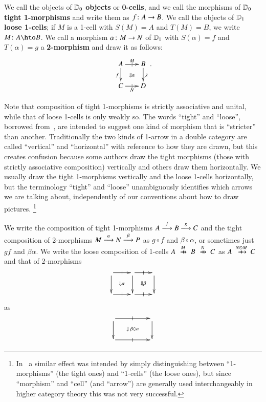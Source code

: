 We call the objects of $\lD_0$ \textbf{objects} or \textbf{0-cells},
and we call the morphisms of $\lD_0$ \textbf{tight 1-morphisms}
and write them as $f\maps A\to B$.  We call the objects of $\lD_1$
\textbf{loose 1-cells}; if $M$ is a 1-cell with $S(M)=A$ and
$T(M)=B$, we write $M\maps A\hto B$.  We call a morphism $\alpha\maps
M\to N$ of $\lD_1$ with $S(\alpha)=f$ and $T(\alpha)=g$ a
\textbf{2-morphism} and draw it as follows:
\begin{equation}\label{eq:square}
  \xymatrix@-.5pc{
    A \ar[r]|{|}^{M}  \ar[d]_f \ar@{}[dr]|{\Downarrow\alpha}&
    B\ar[d]^g\\
    C \ar[r]|{|}_N & D
  }.
\end{equation}


Note that composition of tight 1-morphisms is strictly associative and unital, while that of loose 1-cells is only weakly so.
The words ``tight'' and ``loose'', borrowed from~\cite{ls:limlax}, are intended to suggest one kind of morphism that is ``stricter'' than another.
Traditionally the two kinds of 1-arrow in a double category are called ``vertical'' and ``horizontal'' with reference to how they are drawn, but this creates confusion because some authors draw the tight morphisms (those with strictly associative composition) vertically and others draw them horizontally.
We usually draw the tight 1-morphisms vertically and the loose 1-cells horizontally, but the terminology ``tight'' and ``loose'' unambiguously identifies which arrows we are talking about, independently of our conventions about how to draw pictures.%
\footnote{In~\cite{shulman:smbicat} a similar effect was intended by simply distinguishing between ``1-morphisms'' (the tight ones) and ``1-cells'' (the loose ones), but since ``morphism'' and ``cell'' (and ``arrow'') are generally used interchangeably in higher category theory this was not very successful.}

We write the composition of tight 1-morphisms $A\too[f] B\too[g] C$
and the tight composition of 2-morphisms $M\too[\alpha]
N\too[\beta] P$ as $g\circ f$ and $\beta\circ\alpha$, or sometimes
just $gf$ and $\beta\alpha$.  We write the loose composition of
1-cells $A\xhto{M} B \xhto{N} C$ as $A\xhto{N\odot M} C$ and that of
2-morphisms
\[\vcenter{\xymatrix{ \ar[r]|-@{|}^-{} \ar[d] \ar@{}[dr]|{\Downarrow\alpha} &
     \ar[r]|-@{|}^-{} \ar[d] \ar@{}[dr]|{\Downarrow\beta} &\ar[d]\\
  \ar[r]|-@{|}_-{} & \ar[r]|-@{|}_-{} & }}\]
as
\[\vcenter{\xymatrix@C=4pc{ \ar[r]|-@{|}^-{} \ar[d] \ar@{}[dr]|{\Downarrow\;\be\odot\al} &  \ar[d]\\
  \ar[r]|-@{|}_-{} & }}\]

